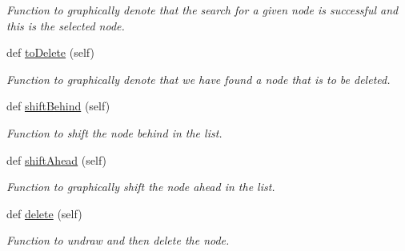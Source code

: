 \begin{DoxyCompactItemize}
\begin{DoxyCompactList}\small\item\em Function to graphically denote that the search for a given node is successful and this is the selected node. \end{DoxyCompactList}\item 
\mbox{\label{class_hash_table_1_1_node_acfcf93acfcce1604cabbc277e153dcda}} 
def \hyperlink{class_hash_table_1_1_node_acfcf93acfcce1604cabbc277e153dcda}{to\+Delete} (self)
\begin{DoxyCompactList}\small\item\em Function to graphically denote that we have found a node that is to be deleted. \end{DoxyCompactList}\item 
\mbox{\label{class_hash_table_1_1_node_a4728273d77870ca7508fc286f9b70281}} 
def \hyperlink{class_hash_table_1_1_node_a4728273d77870ca7508fc286f9b70281}{shift\+Behind} (self)
\begin{DoxyCompactList}\small\item\em Function to shift the node behind in the list. \end{DoxyCompactList}\item 
\mbox{\label{class_hash_table_1_1_node_aee7e9400a9c85d22d1d9ccb2fe7e904e}} 
def \hyperlink{class_hash_table_1_1_node_aee7e9400a9c85d22d1d9ccb2fe7e904e}{shift\+Ahead} (self)
\begin{DoxyCompactList}\small\item\em Function to graphically shift the node ahead in the list. \end{DoxyCompactList}\item 
\mbox{\label{class_hash_table_1_1_node_a27ce172402b61db8d9885799d40e03b9}} 
def \hyperlink{class_hash_table_1_1_node_a27ce172402b61db8d9885799d40e03b9}{delete} (self)
\begin{DoxyCompactList}\small\item\em Function to undraw and then delete the node. \end{DoxyCompactList}\end{DoxyCompactItemize}
